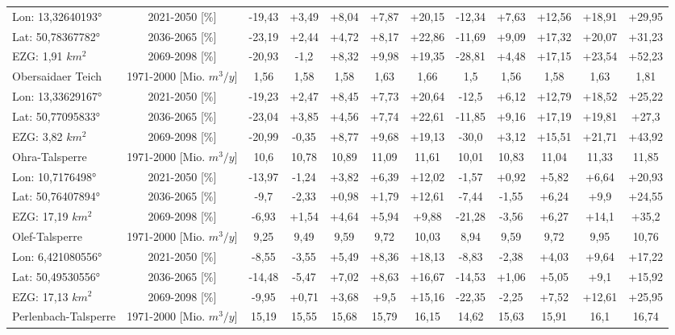 \begin{longtable}{@{\extracolsep{\fill}}lc|ccccc||ccccc}
\cline{2-12} 
Lon: 13,32640193° & 2021-2050 [\%]  & -19,43 & +3,49 & +8,04 & +7,87 & +20,15 & -12,34 & +7,63 & +12,56 & +18,91 & +29,95\\ 
Lat: 50,78367782° & 2036-2065 [\%]  & -23,19 & +2,44 & +4,72 & +8,17 & +22,86 & -11,69 & +9,09 & +17,32 & +20,07 & +31,23\\ 
EZG: 1,91 $km^2$ & 2069-2098 [\%]  & -20,93 & -1,2 & +8,32 & +9,98 & +19,35 & -28,81 & +4,48 & +17,15 & +23,54 & +52,23\\ 
\hline 
Obersaidaer Teich & 1971-2000 [Mio. $m^3/y$]  & 1,56 & 1,58 & 1,58 & 1,63 & 1,66 & 1,5 & 1,56 & 1,58 & 1,63 & 1,81\\ 
\cline{2-12} 
Lon: 13,33629167° & 2021-2050 [\%]  & -19,23 & +2,47 & +8,45 & +7,73 & +20,64 & -12,5 & +6,12 & +12,79 & +18,52 & +25,22\\ 
Lat: 50,77095833° & 2036-2065 [\%]  & -23,04 & +3,85 & +4,56 & +7,74 & +22,61 & -11,85 & +9,16 & +17,19 & +19,81 & +27,3\\ 
EZG: 3,82 $km^2$ & 2069-2098 [\%]  & -20,99 & -0,35 & +8,77 & +9,68 & +19,13 & -30,0 & +3,12 & +15,51 & +21,71 & +43,92\\ 
\hline 
Ohra-Talsperre & 1971-2000 [Mio. $m^3/y$]  & 10,6 & 10,78 & 10,89 & 11,09 & 11,61 & 10,01 & 10,83 & 11,04 & 11,33 & 11,85\\ 
\cline{2-12} 
Lon: 10,7176498° & 2021-2050 [\%]  & -13,97 & -1,24 & +3,82 & +6,39 & +12,02 & -1,57 & +0,92 & +5,82 & +6,64 & +20,93\\ 
Lat: 50,76407894° & 2036-2065 [\%]  & -9,7 & -2,33 & +0,98 & +1,79 & +12,61 & -7,44 & -1,55 & +6,24 & +9,9 & +24,55\\ 
EZG: 17,19 $km^2$ & 2069-2098 [\%]  & -6,93 & +1,54 & +4,64 & +5,94 & +9,88 & -21,28 & -3,56 & +6,27 & +14,1 & +35,2\\ 
\hline 
Olef-Talsperre & 1971-2000 [Mio. $m^3/y$]  & 9,25 & 9,49 & 9,59 & 9,72 & 10,03 & 8,94 & 9,59 & 9,72 & 9,95 & 10,76\\ 
\cline{2-12} 
Lon: 6,421080556° & 2021-2050 [\%]  & -8,55 & -3,55 & +5,49 & +8,36 & +18,13 & -8,83 & -2,38 & +4,03 & +9,64 & +17,22\\ 
Lat: 50,49530556° & 2036-2065 [\%]  & -14,48 & -5,47 & +7,02 & +8,63 & +16,67 & -14,53 & +1,06 & +5,05 & +9,1 & +15,92\\ 
EZG: 17,13 $km^2$ & 2069-2098 [\%]  & -9,95 & +0,71 & +3,68 & +9,5 & +15,16 & -22,35 & -2,25 & +7,52 & +12,61 & +25,95\\ 
\hline 
Perlenbach-Talsperre & 1971-2000 [Mio. $m^3/y$]  & 15,19 & 15,55 & 15,68 & 15,79 & 16,15 & 14,62 & 15,63 & 15,91 & 16,1 & 16,74\\ 

\end{longtable}

